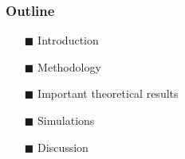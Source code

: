 

\begin{frame}
    \frametitle{Outline}
    
    
    \begin{itemize}
    
      \item[$\blacksquare$] Introduction
    
      \vspace{5mm}
    
      \item[$\blacksquare$] Methodology
    
    
     \vspace{5mm}
    
     \item[$\blacksquare$] Important theoretical results
    
      \vspace{5mm}
    
      \item[$\blacksquare$] Simulations
    
      \vspace{5mm}
    
     \item[$\blacksquare$] Discussion
    
    
    
    \end{itemize}
\end{frame}
    